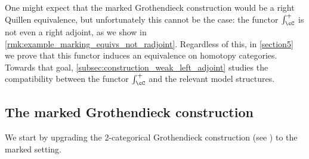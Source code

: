 \documentclass[11pt, dvipsnames]{amsart}
\begin{document}
        One might expect that the marked Grothendieck construction  would be a right Quillen equivalence, but unfortunately this cannot be the case: the functor $\int_\cC^+$ is not even a right adjoint, as we show in \cref{rmk:example_marking_equivs_not_radjoint}. Regardless of this, in \cref{section5} we prove that this functor induces an equivalence on homotopy categories. Towards that goal, \cref{subsec:construction_weak_left_adjoint} studies the compatibility between the functor $\int_\cC^+$ and the relevant model structures.
        

    \subsection{The marked Grothendieck construction}
    \label{subsec:marked_GC}
         We start by upgrading the 2-categorical Grothendieck construction (see \cite{Buckley2014}) to the marked setting.
\end{document}

